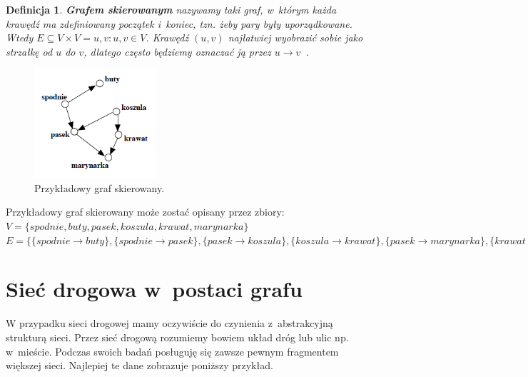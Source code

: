 \documentclass[twoside,12pt]{report}
\newtheorem{definition}{Definicja} %
\begin{document}
\vspace*{30px}
\begin{definition}\label{Graf skierowany}
\textbf{Grafem skierowanym} nazywamy taki graf, w~którym każda krawędź ma zdefiniowany początek i~koniec, tzn. żeby pary były uporządkowane. Wtedy $E \subseteq V \times V = {{u,v}:u,v \in V}$.
Krawędź $(u,v)$ najłatwiej wyobrazić sobie jako strzałkę od $u$ do $v$, dlatego często będziemy oznaczać ją przez $u \rightarrow v$~\cite{grafy}.
\end{definition}

\begin{figure}[ht]
\begin{center}
\includegraphics[width=0.40\textwidth]{img/graf2}
\caption{Przykładowy graf skierowany.} 
\end{center}
\end{figure}

Przykładowy graf skierowany może zostać opisany przez zbiory:
\newline
\begin{math}
V=\{spodnie, buty, pasek, koszula, krawat, marynarka\}
\end{math}
\newline
\begin{math}
E=\{\{spodnie \rightarrow buty\},\{spodnie  \rightarrow pasek\},
	\{pasek \rightarrow koszula\},\{koszula \rightarrow krawat\},
	\{pasek \rightarrow marynarka\},\{krawat \rightarrow marynarka\}\}
\end{math}

\section{Sieć drogowa w~postaci grafu}
W przypadku sieci drogowej mamy oczywiście do czynienia z~abstrakcyjną strukturą sieci. Przez sieć drogową rozumiemy bowiem układ dróg lub ulic np. w~mieście. Podczas swoich badań posługuję się zawsze pewnym fragmentem większej sieci. Najlepiej te dane zobrazuje poniższy przykład.
\end{document}
